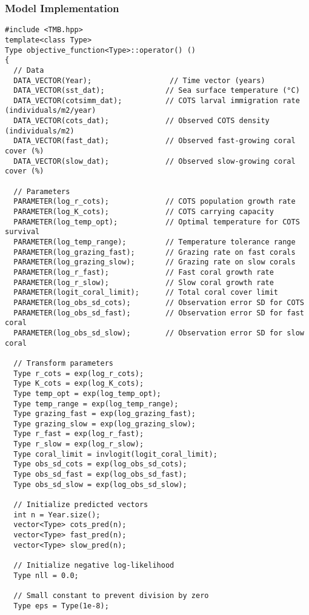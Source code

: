 \subsubsection{Model Implementation}
\begin{lstlisting}
#include <TMB.hpp>
template<class Type>
Type objective_function<Type>::operator() ()
{
  // Data
  DATA_VECTOR(Year);                  // Time vector (years)
  DATA_VECTOR(sst_dat);              // Sea surface temperature (°C)
  DATA_VECTOR(cotsimm_dat);          // COTS larval immigration rate (individuals/m2/year)
  DATA_VECTOR(cots_dat);             // Observed COTS density (individuals/m2)
  DATA_VECTOR(fast_dat);             // Observed fast-growing coral cover (%)
  DATA_VECTOR(slow_dat);             // Observed slow-growing coral cover (%)
  
  // Parameters
  PARAMETER(log_r_cots);             // COTS population growth rate
  PARAMETER(log_K_cots);             // COTS carrying capacity
  PARAMETER(log_temp_opt);           // Optimal temperature for COTS survival
  PARAMETER(log_temp_range);         // Temperature tolerance range
  PARAMETER(log_grazing_fast);       // Grazing rate on fast corals
  PARAMETER(log_grazing_slow);       // Grazing rate on slow corals
  PARAMETER(log_r_fast);             // Fast coral growth rate
  PARAMETER(log_r_slow);             // Slow coral growth rate
  PARAMETER(logit_coral_limit);      // Total coral cover limit
  PARAMETER(log_obs_sd_cots);        // Observation error SD for COTS
  PARAMETER(log_obs_sd_fast);        // Observation error SD for fast coral
  PARAMETER(log_obs_sd_slow);        // Observation error SD for slow coral
  
  // Transform parameters
  Type r_cots = exp(log_r_cots);
  Type K_cots = exp(log_K_cots);
  Type temp_opt = exp(log_temp_opt);
  Type temp_range = exp(log_temp_range);
  Type grazing_fast = exp(log_grazing_fast);
  Type grazing_slow = exp(log_grazing_slow);
  Type r_fast = exp(log_r_fast);
  Type r_slow = exp(log_r_slow);
  Type coral_limit = invlogit(logit_coral_limit);
  Type obs_sd_cots = exp(log_obs_sd_cots);
  Type obs_sd_fast = exp(log_obs_sd_fast);
  Type obs_sd_slow = exp(log_obs_sd_slow);
  
  // Initialize predicted vectors
  int n = Year.size();
  vector<Type> cots_pred(n);
  vector<Type> fast_pred(n);
  vector<Type> slow_pred(n);
  
  // Initialize negative log-likelihood
  Type nll = 0.0;
  
  // Small constant to prevent division by zero
  Type eps = Type(1e-8);
  

\end{lstlisting}
